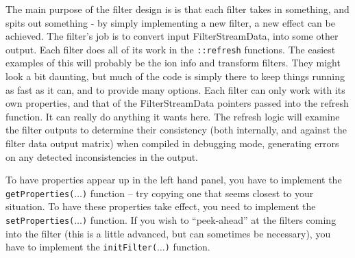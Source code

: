 \documentclass[10pt]{article}
\begin{document}
The main purpose of the filter design is is that each filter takes in something, and spits out something - by simply implementing a new filter, a new effect can be achieved. The filter's job is to convert input FilterStreamData, into some other output.  Each filter does all of its work in the \texttt{::refresh} functions. The easiest examples of this will probably be the ion info and transform filters. They might look a bit daunting, but much of the code is simply there to keep things running as fast as it can, and to provide many options. Each filter can only work with its own properties, and that of the FilterStreamData pointers passed into the refresh function. It can really do anything it wants here. The refresh logic will examine the filter outputs to determine their consistency  (both internally, and against the filter data output matrix) when compiled in debugging mode, generating errors on any detected inconsistencies in the output.

To have properties appear up in the left hand panel, you have to implement the \texttt{getProperties($\ldots$)} function -- try copying one that seems closest to your situation. To have these properties take effect, you need to implement the \texttt{setProperties($\ldots$)} function. If you wish to ``peek-ahead'' at the filters coming into the filter (this is a little advanced, but can sometimes be necessary), you have to implement the \texttt{initFilter($\ldots$)} function.



\end{document}
